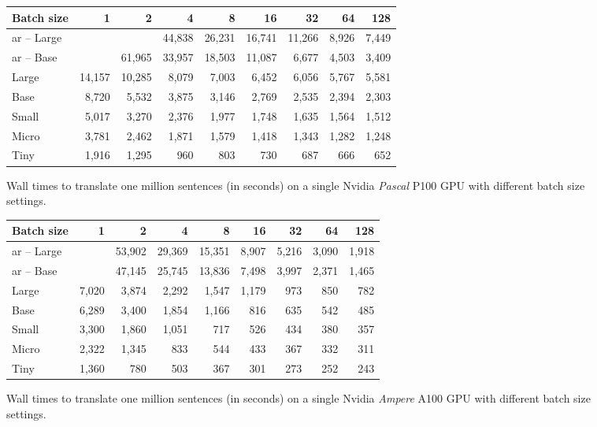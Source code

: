\begin{figure}
  \centering

  
  \vspace{1\baselineskip}

  \begin{tabular}{lrrrrrrrr}
    \toprule
    Batch size & 1 & 2 & 4 & 8 & 16 & 32 & 64 & 128\\
    \midrule
    \acs{ar} -- Large &&        & 44,838 & 26,231 & 16,741 & 11,266 & 8,926 & 7,449 \\
    \acs{ar} -- Base  && 61,965 & 33,957 & 18,503 & 11,087 &  6,677 & 4,503 & 3,409 \\
    \midrule
    Large & 14,157 & 10,285 & 8,079 & 7,003 & 6,452 & 6,056 & 5,767 & 5,581 \\
    Base  &  8,720 &  5,532 & 3,875 & 3,146 & 2,769 & 2,535 & 2,394 & 2,303 \\
    Small &  5,017 &  3,270 & 2,376 & 1,977 & 1,748 & 1,635 & 1,564 & 1,512 \\
    Micro &  3,781 &  2,462 & 1,871 & 1,579 & 1,418 & 1,343 & 1,282 & 1,248 \\
    Tiny  &  1,916 &  1,295 &   960 &   803 &   730 &   687 &   666 &   652 \\
    \bottomrule
  \end{tabular}

  \caption{Wall times to translate one million sentences (in seconds) on a
    single Nvidia \emph{Pascal} P100 GPU with different batch size settings.}%
  \label{fig:throughput:p100}
\end{figure}


\begin{figure}
  \centering

  
  \vspace{1\baselineskip}

  \begin{tabular}{lrrrrrrrr}
    \toprule
    Batch size & 1 & 2 & 4 & 8 & 16 & 32 & 64 & 128 \\
    \midrule
    \acs{ar} -- Large && 53,902 & 29,369 & 15,351 & 8,907 & 5,216 & 3,090 & 1,918 \\
    \acs{ar} -- Base  && 47,145 & 25,745 & 13,836 & 7,498 & 3,997 & 2,371 & 1,465 \\
    \midrule
    Large & 7,020 & 3,874 & 2,292 & 1,547 & 1,179 & 973 & 850 & 782 \\
    Base  & 6,289 & 3,400 & 1,854 & 1,166 &   816 & 635 & 542 & 485 \\
    Small & 3,300 & 1,860 & 1,051 &   717 &   526 & 434 & 380 & 357 \\
    Micro & 2,322 & 1,345 &   833 &   544 &   433 & 367 & 332 & 311 \\
    Tiny  & 1,360 &   780 &   503 &   367 &   301 & 273 & 252 & 243 \\
    \bottomrule
  \end{tabular}

  \caption{Wall times to translate one million sentences (in seconds) on a
    single Nvidia \emph{Ampere} A100 GPU with different batch size settings.}%
  \label{fig:throughput:a100}
\end{figure}




